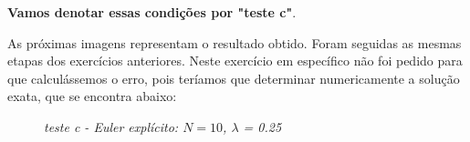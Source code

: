 \documentclass[a4paper, 12pt]{article}
\begin{document}
\textbf{Vamos denotar essas condições por "teste c"}.

As próximas imagens representam o resultado obtido. Foram seguidas as mesmas etapas dos exercícios anteriores. Neste exercício em específico não foi pedido para que calculássemos o erro, pois teríamos que determinar numericamente a solução exata, que se encontra abaixo:


\begin{figure}[H]
	\centering
	\caption{\textit{teste c - Euler explícito: $N = 10$, $\lambda$ = 0.25}}
\end{figure}  
\end{document}
